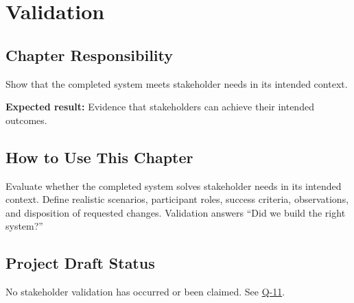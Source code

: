 \chapter{Validation}
\section{Chapter Responsibility}
\label{Section:ValidationResponsibility}
Show that the completed system meets stakeholder needs in its intended context.

\noindent\textbf{Expected result:} Evidence that stakeholders can achieve their intended outcomes.

\section{How to Use This Chapter}
Evaluate whether the completed system solves stakeholder needs in its intended context. Define realistic scenarios, participant roles, success criteria, observations, and disposition of requested changes.
Validation answers ``Did we build the right system?''

\section{Project Draft Status}
No stakeholder validation has occurred or been claimed. See \hyperref[Question:Q-11]{Q-11}.
